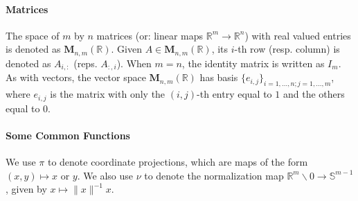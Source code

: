 \paragraph{Matrices}The space of $m$ by $n$ matrices (or: linear maps $\mathbb{R}^m\to \mathbb{R}^n$) with real valued entries is denoted as $\mathbf{M}_{n,m}(\mathbb{R})$. Given $A\in \mathbf{M}_{n,m}(\mathbb{R})$, its $i$-th row (resp. column) is denoted as $A_{i,:}$ (reps. $A_{:,i}$). When $m=n$, the identity matrix is written as $I_m$. As with vectors, the vector space $\mathbf{M}_{n,m}(\mathbb{R})$ has basis $\{e_{i,j}\}_{i=1,\dotsc,n; j=1,\dotsc, m}$, where $e_{i,j}$ is the matrix with only the $(i,j)$-th entry equal to $1$ and the others equal to $0$.

\paragraph{Some Common Functions}We use $\pi$ to denote coordinate projections, which are maps of the form $(x,y)\mapsto x$ or $y$. We also use $\nu$ to denote the normalization map $\mathbb{R}^{m}\smallsetminus 0\to \mathbb{S}^{m-1}$, given by $x\mapsto \|x\|^{-1}x$.

